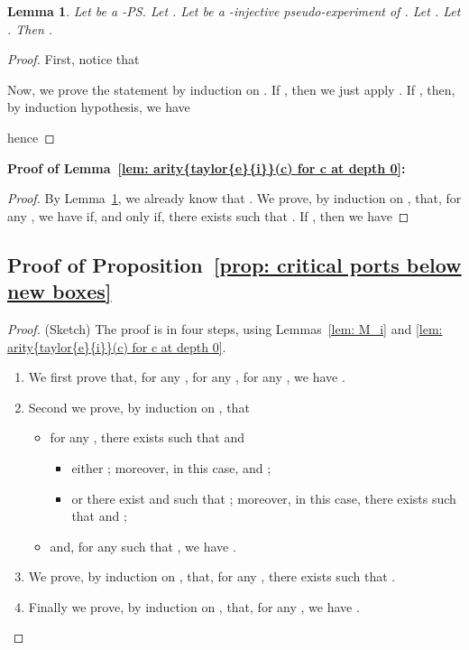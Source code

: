 \documentclass{article}
\theoremstyle{plain}
\newtheorem{lem}[theorem]{Lemma}
\begin{document}
\begin{lem}\label{lemma: m_{k, 0}(c)}
Let  be a -PS. Let . Let  be a -injective pseudo-experiment of . Let . Let . Then .
\end{lem}

\begin{proof}
First, notice that 

Now, we prove the statement by induction on . If , then we just apply . If , then, by induction hypothesis, we have

hence

\end{proof}

\textbf{Proof of Lemma~\ref{lem: arity{taylor{e}{i}}(c) for c at depth 0}:}

\begin{proof}
By Lemma~\ref{lemma: m_{k, 0}(c)}, we already know that . We prove, by induction on , that, for any , we have  if, and only if, there exists  such that . If , then we have

\end{proof}

\subsection{Proof of Proposition~\ref{prop: critical ports below new boxes}}

\begin{proof}
(Sketch) The proof is in four steps, using Lemmas~\ref{lem: M_i} and \ref{lem: arity{taylor{e}{i}}(c) for c at depth 0}. \begin{enumerate}
\item\label{item: step1} We first prove that, for any , for any , for any , we have  .
\item\label{item: step2} Second we prove, by induction on , that
\begin{itemize}
\item for any , there exists  such that  and
\begin{itemize}
\item either ; moreover, in this case,  and ;
\item or there exist  and  such that  \mbox{;}  moreover, in this case, there exists  such that  and  
      ;
\end{itemize}
\item and, for any  such that , we have .
\end{itemize}
\item\label{item: step3} We prove, by induction on , that, for any , there exists  such that . \item\label{item: step4} Finally we prove, by induction on , that, for any , we have . 
\end{enumerate}
\end{proof}
\end{document}
